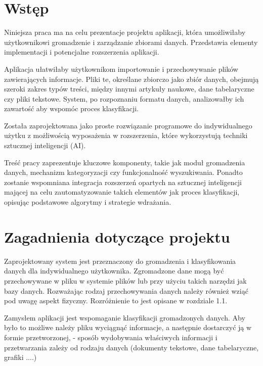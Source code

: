 \documentclass[12pt,a4paper,twoside]{article}
\begin{document}
\section*{Wstęp}
Niniejsza praca ma na celu prezentacje projektu aplikacji, która umożliwiłaby użytkownikowi gromadzenie i zarządzanie zbiorami danych. Przedstawia elementy implementacji i potencjalne rozszerzenia aplikacji.\par
Aplikacja ułatwiłaby użytkownikom importowanie i przechowywanie plików zawierających informacje. Pliki te, określane zbiorczo jako zbiór danych, obejmują szeroki zakres typów treści, między innymi artykuły naukowe, dane tabelaryczne czy pliki tekstowe. System, po rozpoznaniu formatu danych, analizowałby ich zawartość aby wspomóc proces klasyfikacji. \par
Została zaprojektowana jako proste rozwiązanie programowe do indywidualnego użytku z możliwością wyposażenia w rozszerzenia, które wykorzystują techniki sztucznej inteligencji (AI).\par
Treść pracy zaprezentuje kluczowe komponenty, takie jak moduł gromadzenia danych, mechanizm kategoryzacji czy funkcjonalność wyszukiwania. Ponadto zostanie wspomniana integracja rozszerzeń opartych na sztucznej inteligencji mającej na celu zautomatyzowanie takich elementów jak proces klasyfikacji, opisując podstawowe algorytmy i strategie wdrażania. 
\newpage
\section{Zagadnienia dotyczące projektu}
Zaprojektowany system jest przeznaczony do gromadzenia i klasyfikowania danych dla indywidualnego użytkownika. Zgromadzone dane mogą być przechowywane w pliku w systemie plików lub przy użyciu takich narzędzi jak bazy danych. Rozważając rodzaj przechowywania danych należy również wziąć pod uwagę aspekt fizyczny. Rozróżnienie to jest opisane w rozdziale 1.1. 
\par
Zamysłem aplikacji jest wspomaganie klasyfikacji gromadzonych danych. Aby było to możliwe należy pliku wyciągnąć informacje, a następnie
       dostarczyć ją w formie przetworzonej,
     - sposób wydobywania właściwych informacji i przetwarzania zależy
       od rodzaju danych (dokumenty tekstowe, dane tabelaryczne, grafiki
       ....)
\end{document}
